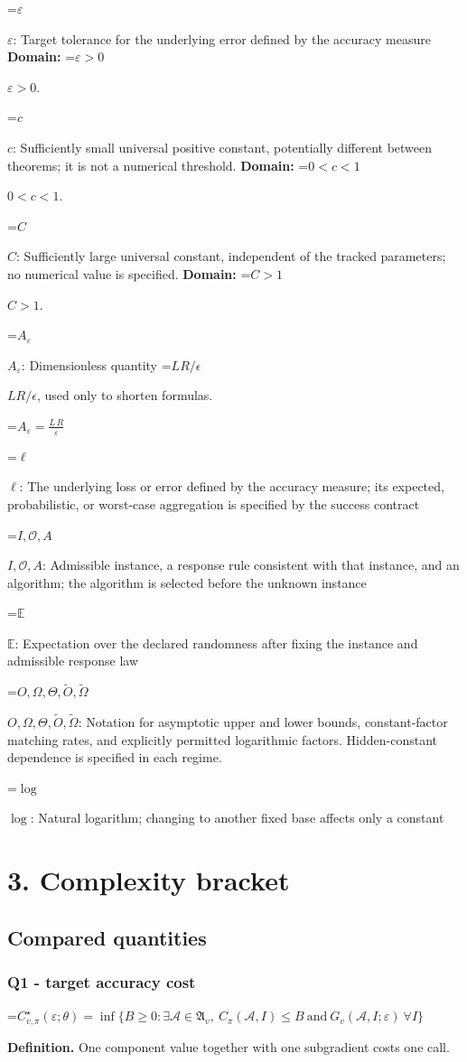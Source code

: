 \documentclass[10pt,a4paper]{article}
\newcommand{\AtlasMath}[1]{\par\begingroup\centering\setbox0=\hbox{$\displaystyle #1$}\ifdim\wd0>1.4\linewidth\typeout{ATLAS WIDE FORMULA: \the\wd0}\fi\ifdim\wd0>\linewidth\resizebox{\linewidth}{!}{\box0}\else\box0\fi\par\endgroup}
\newcommand{\AtlasInlineMath}[1]{\begingroup\setbox0=\hbox{$#1$}\ifdim\wd0>.4\linewidth\endgroup\AtlasMath{#1}\else\endgroup$#1$\fi}
\begin{document}
\AtlasInlineMath{\varepsilon}: Target tolerance for the underlying error defined by the accuracy measure \textbf{Domain:} \AtlasInlineMath{\varepsilon>0}.

\AtlasInlineMath{c}: Sufficiently small universal positive constant, potentially different between theorems; it is not a numerical threshold. \textbf{Domain:} \AtlasInlineMath{0<c<1}.

\AtlasInlineMath{C}: Sufficiently large universal constant, independent of the tracked parameters; no numerical value is specified. \textbf{Domain:} \AtlasInlineMath{C>1}.

\AtlasInlineMath{A_\varepsilon}: Dimensionless quantity \AtlasInlineMath{LR/\epsilon}, used only to shorten formulas.


\AtlasMath{A_\varepsilon=\frac{L\,R}{\varepsilon}}


\AtlasInlineMath{\ell}: The underlying loss or error defined by the accuracy measure; its expected, probabilistic, or worst-case aggregation is specified by the success contract

\AtlasInlineMath{I,\mathcal{O},A}: Admissible instance, a response rule consistent with that instance, and an algorithm; the algorithm is selected before the unknown instance

\AtlasInlineMath{\mathbb{E}}: Expectation over the declared randomness after fixing the instance and admissible response law

\AtlasInlineMath{O,\Omega,\Theta,\widetilde{O},\widetilde\Omega}: Notation for asymptotic upper and lower bounds, constant-factor matching rates, and explicitly permitted logarithmic factors. Hidden-constant dependence is specified in each regime.

\AtlasInlineMath{\log}: Natural logarithm; changing to another fixed base affects only a constant

\section{3. Complexity bracket}
\subsection{Compared quantities}
\subsubsection{Q1 - target accuracy cost}
\AtlasMath{C^\star_{v,\pi}(\varepsilon;\theta)=\inf\{B\ge0:\exists\mathcal A\in\mathfrak A_v,\ C_\pi(\mathcal A,I)\le B\ \text{and}\ G_v(\mathcal A,I;\varepsilon)\ \forall I\}}
\textbf{Definition.} One component value together with one subgradient costs one call.
\end{document}
